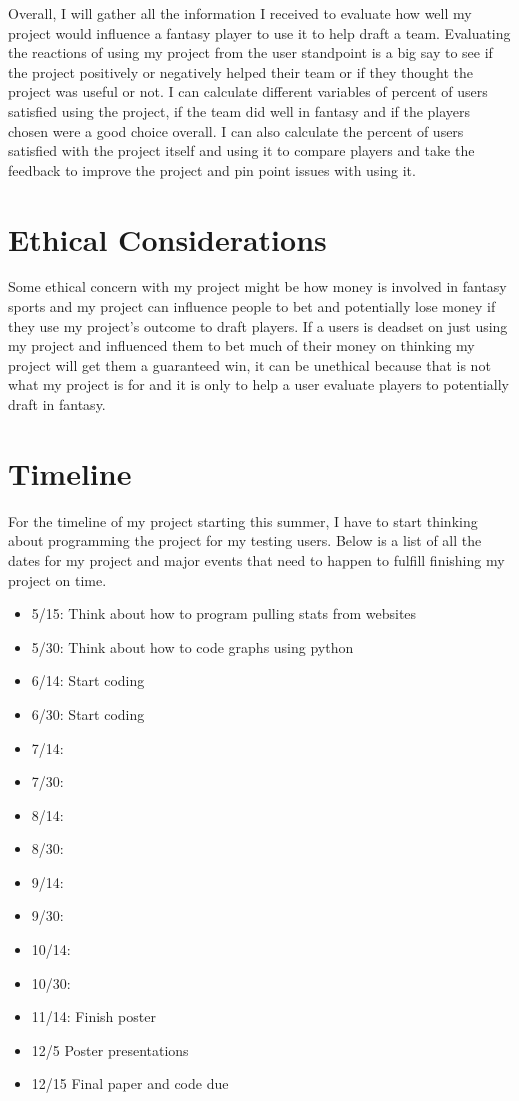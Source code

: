 \documentclass[10pt,twocolumn]{article}
\begin{document}
Overall, I will gather all the information I received to evaluate how well my project would influence a fantasy player to use it to help draft a team. Evaluating the reactions of using my project from the user standpoint is a big say to see if the project positively or negatively helped their team or if they thought the project was useful or not. I can calculate different variables of percent of users satisfied using the project, if the team did well in fantasy and if the players chosen were a good choice overall. I can also calculate the percent of users satisfied with the project itself and using it to compare players and take the feedback to improve the project and pin point issues with using it. 

\section{Ethical Considerations}
Some ethical concern with my project might be how money is involved in fantasy sports and my project can influence people to bet and potentially lose money if they use my project's outcome to draft players. If a users is deadset on just using my project and influenced them to bet much of their money on thinking my project will get them a guaranteed win, it can be unethical because that is not what my project is for and it is only to help a user evaluate players to potentially draft in fantasy.  


\section{Timeline}
For the timeline of my project starting this summer, I have to start thinking about programming the project for my testing users. Below is a list of all the dates for my project and major events that need to happen to fulfill finishing my project on time. 

\begin{itemize}
    \item 5/15: Think about how to program pulling stats from websites
    \item 5/30: Think about how to code graphs using python
    \item 6/14: Start coding
    \item 6/30: Start coding
    \item 7/14: 
    \item 7/30:
    \item 8/14: 
    \item 8/30: 
    \item 9/14:
    \item 9/30:
    \item 10/14:
    \item 10/30:
    \item 11/14: Finish poster
    \item 12/5 Poster presentations
    \item 12/15 Final paper and code due
\end{itemize}


\printbibliography 
\end{document}
